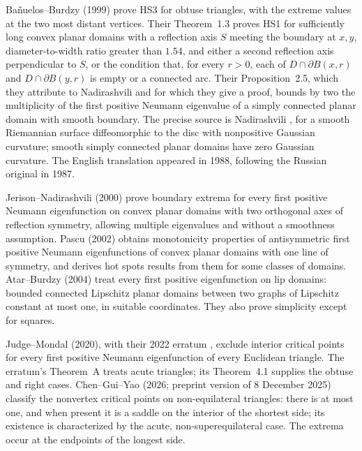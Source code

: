 \documentclass[11pt]{article}
\theoremstyle{definition}
\theoremstyle{remark}
\numberwithin{equation}{section}
\begin{document}
Ba\~nuelos--Burdzy (1999) \cite[Theorem~1.2]{BB1999} prove HS3 for obtuse triangles, with the extreme values
at the two most distant vertices. Their Theorem~1.3 proves HS1 for sufficiently long convex planar domains with a reflection
axis $S$ meeting the boundary at $x,y$, diameter-to-width ratio greater than $1.54$, and either a second
reflection axis perpendicular to $S$, or the condition that, for every $r>0$, each of
$D\cap\partial B(x,r)$ and $D\cap\partial B(y,r)$ is empty or a connected arc.
Their Proposition~2.5, which they attribute to Nadirashvili and for which they give a proof, bounds by two the multiplicity of the first positive Neumann eigenvalue of a simply connected planar domain with smooth boundary.
The precise source is Nadirashvili \cite[Theorem~3]{Nadirashvili}, for a smooth Riemannian surface
diffeomorphic to the disc with nonpositive Gaussian curvature; smooth simply connected planar domains have
zero Gaussian curvature. The English translation appeared in 1988, following the Russian original in 1987.

Jerison--Nadirashvili (2000) \cite[Theorem~1.4]{JN2000} prove boundary extrema for every first positive
Neumann eigenfunction on convex planar domains with two orthogonal axes of reflection symmetry, allowing
multiple eigenvalues and without a smoothness assumption. Pascu (2002) \cite{Pascu} obtains monotonicity properties of
antisymmetric first positive Neumann eigenfunctions of convex planar domains with one line of
symmetry, and derives hot spots results from them for some classes of domains. Atar--Burdzy (2004) \cite[Theorem~1]{AB2004} treat every first positive eigenfunction
on lip domains: bounded connected Lipschitz planar domains between two graphs of Lipschitz constant at
most one, in suitable coordinates. They also prove simplicity except for squares.

Judge--Mondal (2020), with their 2022 erratum \cite{JM2020,JM2022}, exclude interior critical points for every
first positive Neumann eigenfunction of every Euclidean triangle. The erratum's Theorem~A treats acute
triangles; its Theorem~4.1 supplies the obtuse and right cases. Chen--Gui--Yao (2026; preprint version of 8 December 2025)
\cite[Theorem~1.2]{CGY} classify the nonvertex critical points on non-equilateral triangles: there is at most
one, and when present it is a saddle on the interior of the shortest side; its existence is characterized
by the acute, non-superequilateral case. The extrema occur at the endpoints of the longest side.
\end{document}

